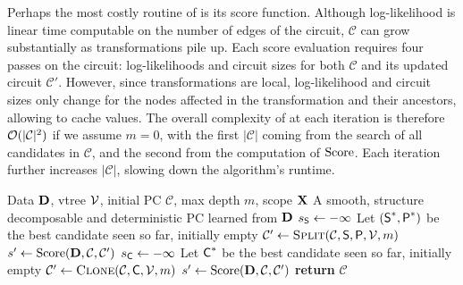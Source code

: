 Perhaps the most costly routine of  is its score function. Although
log-likelihood is linear time computable on the number of edges of the circuit, $\mathcal{C}$ can
grow substantially as transformations pile up. Each score evaluation requires four passes on the
circuit: log-likelihoods and circuit sizes for both $\mathcal{C}$ and its updated circuit
$\mathcal{C}'$. However, since transformations are local, log-likelihood and circuit sizes only
change for the nodes affected in the transformation and their ancestors, allowing
 to cache values. The overall complexity of  at each
iteration is therefore $\mathcal{O}(|\mathcal{C}|^2)$ if we assume $m=0$, with the first $|\mathcal{C}|$
coming from the search of all candidates in $\mathcal{C}$, and the second from the computation of
$\operatorname{\normalfont{Score}}$. Each iteration further increases $|\mathcal{C}|$, slowing down the algorithm's runtime.

\begin{algorithm}[t]
  \caption{}\label{alg:learnpsdd}
  \begin{algorithmic}[1]
    \Require Data $\mathbf{D}$, vtree $\operatorname{\mathcal{V}}$, initial PC $\mathcal{C}$, max depth $m$, scope $\mathbf{X}$
    \Ensure A smooth, structure decomposable and deterministic PC learned from $\mathbf{D}$
      \State $s_{\operatorname{\textup{\textsf{S}}}}\gets -\infty$
      \State Let $(\operatorname{\textup{\textsf{S}}}^\ast,\operatorname{\textup{\textsf{P}}}^\ast)$ be the best  candidate seen so far, initially empty
        \State $\mathcal{C}'\gets\textproc{Split}(\mathcal{C},\Sum,\Prod,\vtree,m)$
        \State $s'\gets\operatorname{\normalfont{Score}}(\mathbf{D},\mathcal{C},\mathcal{C}')$
      \EndFor
      \State $s_{\operatorname{\textup{\textsf{C}}}}\gets -\infty$
      \State Let $\operatorname{\textup{\textsf{C}}}^\ast$ be the best  candidate seen so far, initially empty
        \State $\mathcal{C}'\gets\textproc{Clone}(\mathcal{C},\Child,\vtree,m)$
        \State $s'\gets\operatorname{\normalfont{Score}}(\mathbf{D},\mathcal{C},\mathcal{C}')$
      \EndFor
    \EndWhile
    \State \textbf{return} $\mathcal{C}$
  \end{algorithmic}
\end{algorithm}

